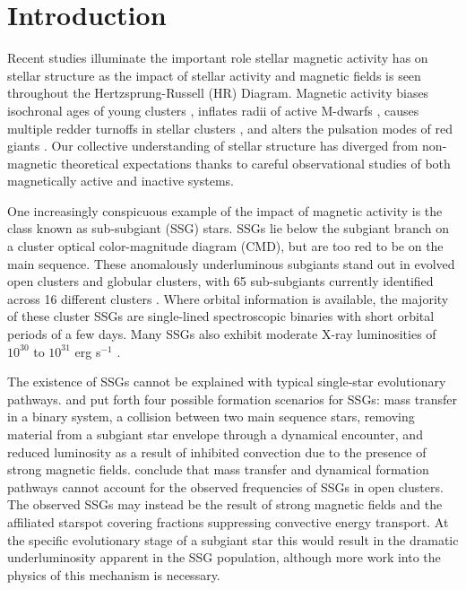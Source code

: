 \documentclass[twocolumn,tighten]{aastex631}
\begin{document}


\section{Introduction}\label{sec:intro}
Recent studies illuminate the important role stellar magnetic activity has on stellar structure as the impact of stellar activity and magnetic fields is seen throughout the Hertzsprung-Russell (HR) Diagram. Magnetic activity biases isochronal ages of young clusters \citep{somers15}, inflates radii of active M-dwarfs \citep{2010AJ....140.1158T,2010ApJ...718..502M,2019MNRAS.483.1125J}, causes multiple redder turnoffs in stellar clusters \citep{2009MNRAS.398L..11B,2019ApJ...876..113S}, and alters the pulsation modes of red giants \citep{2020A&A...639A..63G}. Our collective understanding of stellar structure has diverged from non-magnetic theoretical expectations thanks to careful observational studies of both magnetically active and inactive systems.

One increasingly conspicuous example of the impact of magnetic activity is the class known as sub-subgiant (SSG) stars. SSGs lie below the subgiant branch on a cluster optical color-magnitude diagram (CMD), but are too red to be on the main sequence. These anomalously underluminous subgiants stand out in evolved open clusters and globular clusters, with 65 sub-subgiants currently identified across 16 different clusters \citep{geller17}. Where orbital information is available, the majority of these cluster SSGs are single-lined spectroscopic binaries with short orbital periods of a few days. Many SSGs also exhibit moderate X-ray luminosities of $10^{30}$ to $10^{31}$ erg s$^{-1}$ \citep[and references therein]{geller17}.

The existence of SSGs cannot be explained with typical single-star evolutionary pathways. \citet{geller17} and \citet{leiner17} put forth four possible formation scenarios for SSGs: mass transfer in a binary system, a collision between two main sequence stars, removing material from a subgiant star envelope through a dynamical encounter, and reduced luminosity as a result of inhibited convection due to the presence of strong magnetic fields. \citet{leiner17} conclude that mass transfer and dynamical formation pathways cannot account for the observed frequencies of SSGs in open clusters. The observed SSGs may instead be the result of strong magnetic fields and the affiliated starspot covering fractions suppressing convective energy transport. At the specific evolutionary stage of a subgiant star this would result in the dramatic underluminosity apparent in the SSG population, although more work into the physics of this mechanism is necessary. 
\end{document}
